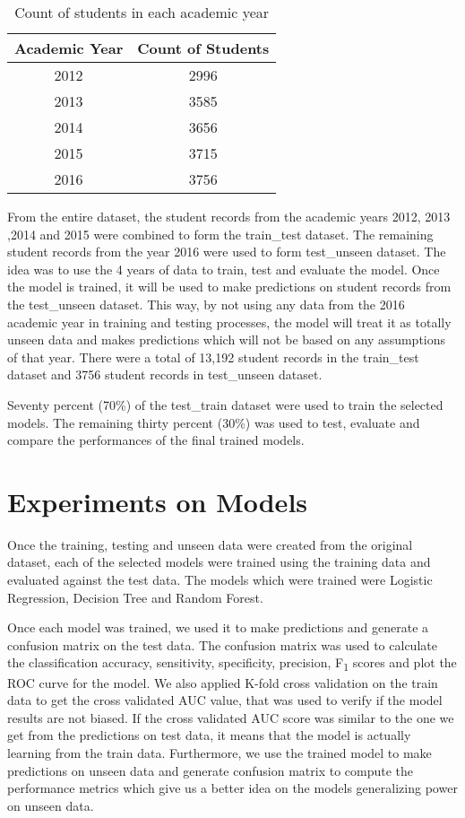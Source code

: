 \documentclass[11pt,openright]{report}
\begin{document}
\begin{table}[!htbp]
	\renewcommand{\arraystretch}{1.3}
	\caption{Count of students in each academic year}
	\label{table:acad_db}
	\centering
	\begin{tabular}{|c|c|}
    \hline
    \bfseries Academic Year & \bfseries Count of Students \\ 
    \hline
  	2012 &  2996 \\ \hline
	2013 & 3585 \\ \hline
	2014 & 3656 \\ \hline
	2015 & 3715 \\ \hline
	2016 & 3756 \\ \hline
\end{tabular} 
\end{table}

From the entire dataset, the student records from the academic years 2012, 2013 ,2014 and 2015 were combined to form the train\_test dataset. The remaining student records from the year 2016 were used to form test\_unseen dataset. The idea was to use the 4 years of data to train, test and evaluate the model. Once the model is trained, it will be used to make predictions on student records from the test\_unseen dataset. This way, by not using any data from the 2016 academic year in training and testing processes, the model will treat it as totally unseen data and makes predictions which will not be based on any assumptions of that year. There were a total of 13,192 student records in the train\_test dataset and 3756 student records in test\_unseen dataset.

Seventy percent (70\%) of the test\_train dataset were used to train the selected models. The remaining thirty percent (30\%) was used to test, evaluate and compare the performances of the final trained models. 

\section {Experiments on Models}
Once the training, testing and unseen data were created from the original dataset, each of the selected models were trained using the training data and evaluated against the test data. The models which were trained were Logistic Regression, Decision Tree and Random Forest. 

Once each model was trained, we used it to make predictions and generate a confusion matrix on the test data. The confusion matrix was used to calculate the classification accuracy, sensitivity, specificity, precision, F\textsubscript{1} scores and plot the ROC curve for the model. We also applied K-fold cross validation on the train data to get the cross validated AUC value, that was used to verify if the model results are not biased. If the cross validated AUC score was similar to the one we get from the predictions on test data, it means that the model is actually learning from the train data. Furthermore, we use the trained model to make predictions on unseen data and generate confusion matrix to compute the performance metrics which give us a better idea on the models generalizing power on unseen data.
\end{document}
